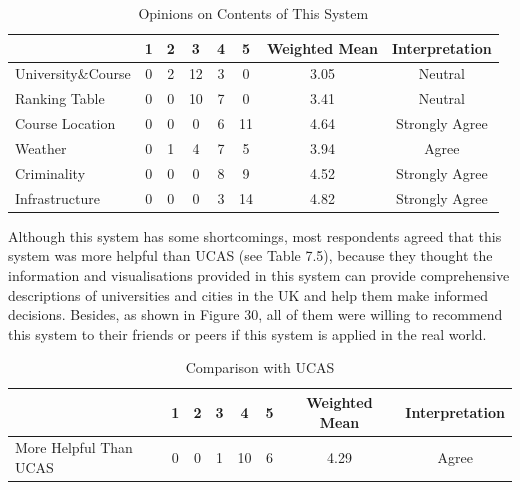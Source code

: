 \begin{table}[H]
\centering
\caption{Opinions on Contents of This System}
\label{my-label}
\begin{tabular}{|p{4cm}|c|c|c|c|c|c|c|}
\hline
                   & \textbf{1} & \textbf{2} & \textbf{3} & \textbf{4} & \textbf{5} & \textbf{Weighted Mean} & \textbf{Interpretation} \\ \hline
University\&Course & 0          & 2          & 12         & 3          & 0          & 3.05                   & Neutral                 \\ \hline
Ranking Table      & 0          & 0          & 10         & 7          & 0          & 3.41                   & Neutral                 \\ \hline
Course Location    & 0          & 0          & 0          & 6          & 11         & 4.64                   & Strongly Agree          \\ \hline
Weather            & 0          & 1          & 4          & 7          & 5          & 3.94                   & Agree                   \\ \hline
Criminality        & 0          & 0          & 0          & 8          & 9          & 4.52                   & Strongly Agree          \\ \hline
Infrastructure     & 0          & 0          & 0          & 3          & 14         & 4.82                   & Strongly Agree          \\ \hline
\end{tabular}
\end{table}

Although this system has some shortcomings, most respondents agreed that this system was more helpful than UCAS (see Table 7.5), because they thought the information and visualisations provided in this system can provide comprehensive descriptions of universities and cities in the UK and help them make informed decisions. Besides, as shown in Figure 30, all of them were willing to recommend this system to their friends or peers if this system is applied in the real world. 

\begin{table}[H]
\centering
\caption{Comparison with UCAS
}
\label{my-label}
\begin{tabular}{|p{4cm}|c|c|c|c|c|c|c|}
\hline
                & \textbf{1} & \textbf{2} & \textbf{3} & \textbf{4} & \textbf{5} & \textbf{Weighted Mean} & \textbf{Interpretation} \\ \hline
More Helpful Than UCAS  & 0          & 0          & 1          & 10         & 6          & 4.29                   & Agree                   \\ \hline 
\end{tabular}
\end{table}



